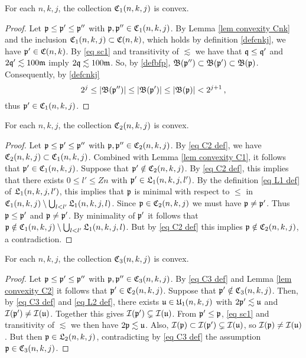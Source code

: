 \begin{lemma}
    \label{lem convexity C1}
    For each $n,k,j$, the collection $\mathfrak C_1(n,k,j)$ is convex.
\end{lemma}

\begin{proof}
    Let $\mathfrak p\le\mathfrak p'\le\mathfrak p''$ with $\mathfrak p, \mathfrak p'' \in \mathfrak C_1(n,k,j)$. By Lemma \ref{lem convexity Cnk} and the inclusion $\mathfrak C_1(n,k,j) \subset \mathfrak C(n,k)$, which holds by definition \eqref{defcnkj}, we have $\mathfrak p' \in \mathfrak C(n,k)$. By \eqref{eq sc1} and transitivity of $\lesssim$ we have that $\mathfrak q \le \mathfrak q'$ and $2 \mathfrak q' \lesssim 100\mathfrak{m}$ imply $2\mathfrak q \lesssim 100\mathfrak{m}$. So, by \eqref{defbfp}, $\mathfrak{B}(\mathfrak p'') \subset \mathfrak{B}(\mathfrak p') \subset \mathfrak{B}(\mathfrak p)$. Consequently, by \eqref{defcnkj}
    $$
        2^j \le |\mathfrak{B}(\mathfrak p'')|\le |\mathfrak{B}(\mathfrak p')| \le |\mathfrak{B}(\mathfrak p)| < 2^{j+1}\,,
    $$
    thus $\mathfrak p' \in \mathfrak C_1(n,k,j)$.
\end{proof}

\begin{lemma}
    \label{lem convexity C2}
    For each $n,k,j$, the collection $\mathfrak C_2(n,k,j)$ is convex.
\end{lemma}

\begin{proof}
     Let $\mathfrak p \le \mathfrak p' \le \mathfrak p''$ with $\mathfrak p, \mathfrak p'' \in \mathfrak C_2(n,k,j)$. By \eqref{eq C2 def}, we have $\mathfrak C_2(n,k,j) \subset \mathfrak C_1(n,k,j)$. Combined with Lemma \ref{lem convexity C1}, it follows that $\mathfrak p' \in \mathfrak C_1(n,k,j)$. Suppose that $\mathfrak p' \notin \mathfrak C_2(n,k,j)$. By \eqref{eq C2 def}, this implies that there exists $0 \le l' \le Zn$  with $\mathfrak p' \in \mathfrak L_1(n,k,j,l')$. By the definition \eqref{eq L1 def} of $\mathfrak L_1(n,k,j,l')$, this implies that $\mathfrak p$ is minimal with respect to $\le$  in $\mathfrak C_1(n,k,j) \setminus \bigcup_{l < l'} \mathfrak L_1(n,k,j,l)$. Since $\mathfrak p \in \mathfrak C_2(n,k,j)$ we must have $\mathfrak p \ne \mathfrak p'$. Thus $\mathfrak p \le \mathfrak p'$ and $\mathfrak p \ne \mathfrak p'$. By minimality of $\mathfrak p'$ it follows that $\mathfrak p \notin \mathfrak C_1(n,k,j) \setminus \bigcup_{l < l'} \mathfrak L_1(n,k,j,l)$. But by \eqref{eq C2 def} this implies $\mathfrak p \notin \mathfrak C_2(n,k,j)$, a contradiction.
\end{proof}

\begin{lemma}
    \label{lem convexity C3}
    For each $n,k,j$, the collection $\mathfrak C_3(n,k,j)$ is convex.
\end{lemma}

\begin{proof}
    Let $\mathfrak p \le \mathfrak p' \le \mathfrak p''$ with $\mathfrak p, \mathfrak p'' \in \mathfrak C_3(n,k,j)$. By \eqref{eq C3 def} and Lemma \ref{lem convexity C2} it follows that $\mathfrak p' \in \mathfrak C_2(n,k,j)$. Suppose that $\mathfrak p' \notin \mathfrak C_3(n,k,j)$. Then, by \eqref{eq C3 def} and \eqref{eq L2 def}, there exists $\mathfrak u \in \mathfrak U_1(n,k,j)$ with $2\mathfrak p' \lesssim \mathfrak u$ and $\mathcal{I}(\mathfrak p') \ne \mathcal{I}(\mathfrak u)$. Together this gives $\mathcal{I}(\mathfrak p') \subsetneq \mathcal{I}(\mathfrak u)$. From $\mathfrak p' \le \mathfrak p$, \eqref{eq sc1} and transitivity of $\lesssim$ we then have $2\mathfrak p \lesssim \mathfrak u$. Also, $\mathcal{I}(\mathfrak p) \subset \mathcal{I}(\mathfrak p') \subsetneq \mathcal{I}(\mathfrak u)$, so $\mathcal{I}(\mathfrak p) \ne \mathcal{I}(\mathfrak u)$. But then $\mathfrak p \in \mathfrak L_2(n,k,j)$, contradicting by \eqref{eq C3 def} the assumption $\mathfrak p \in \mathfrak C_3(n,k,j)$.
\end{proof}

